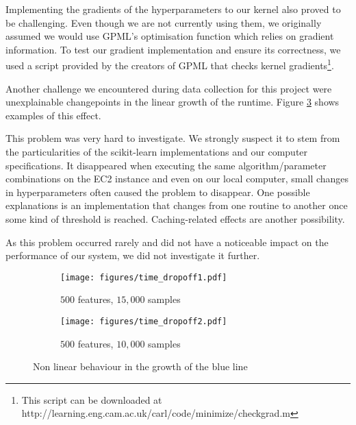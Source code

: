\documentclass[a4paper,12pt,twoside,openright]{report}
\begin{document}
Implementing the gradients of the hyperparameters to our kernel also proved to be challenging. Even though we are not currently using them, we originally assumed we would use GPML's optimisation function which relies on gradient information. To test our gradient implementation and ensure its correctness, we used a script provided by the creators of GPML that checks kernel gradients\footnote{This script can be downloaded at http://learning.eng.cam.ac.uk/carl/code/minimize/checkgrad.m}. %


Another challenge we encountered during data collection for this project were unexplainable changepoints in the linear growth of the runtime. Figure \ref{time_hinge} shows examples of this effect.

This problem was very hard to investigate. We strongly suspect it to stem from the particularities of the scikit-learn implementations and our computer specifications. It  disappeared when executing the same algorithm/parameter combinations on the EC2 instance and even on our local computer, small changes in hyperparameters often caused the problem to disappear. One possible explanations is an implementation that changes from one routine to another once some kind of threshold is reached. Caching-related effects are another possibility.

As this problem occurred rarely and did not have a noticeable impact on the performance of our system, we did not investigate it further.




\begin{figure}
\centering
\begin{subfigure}{.45\textwidth}
  \centering
  \texttt{[image: figures/time\_dropoff1.pdf]}
  \caption{$500$ features, $15,000$ samples}
  \label{time_dropoff1}
\end{subfigure}%
\begin{subfigure}{.45\textwidth}
  \centering
  \texttt{[image: figures/time\_dropoff2.pdf]}
  \caption{$500$ features, $10,000$ samples}
  \label{time_dropoff2}
\end{subfigure}
\caption{Non linear behaviour in the growth of the blue line}
\label{time_hinge}
\end{figure}
\end{document}
